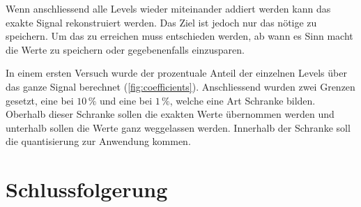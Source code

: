 \begin{refsection}
Wenn anschliessend alle Levels wieder miteinander addiert werden kann das exakte Signal rekonstruiert werden.
Das Ziel ist jedoch nur das nötige zu speichern.
Um das zu erreichen muss entschieden werden, ab wann es Sinn macht die Werte zu speichern oder gegebenenfalls einzusparen.

In einem ersten Versuch wurde der prozentuale Anteil der einzelnen Levels über das ganze Signal berechnet (\autoref{fig:coefficients}).
Anschliessend wurden zwei Grenzen gesetzt, eine bei  $10\,\text{\%}$ und eine bei $1\,\text{\%}$, welche eine Art Schranke bilden.
Oberhalb dieser Schranke sollen die exakten Werte übernommen werden und unterhalb sollen die Werte ganz weggelassen werden.
Innerhalb der Schranke soll die quantisierung zur Anwendung kommen.

\section{Schlussfolgerung}

\printbibliography[heading=subbibliography]
\end{refsection}
